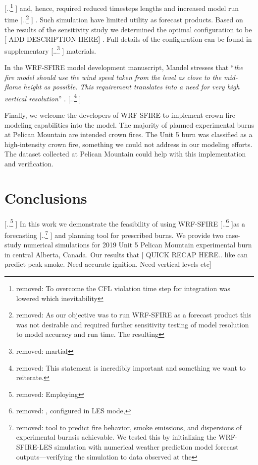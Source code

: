 \documentclass[preprints,article,accept,moreauthors,pdftex]{Definitions/mdpi}
\providecommand{\DIFadd}[1]{{\protect\color{blue} \sf #1}} %
\providecommand{\DIFdel}[1]{{\protect\color{red} [..\footnote{removed: #1} ]}} %
\providecommand{\DIFaddbegin}{} %
\providecommand{\DIFaddend}{} %
\providecommand{\DIFdelbegin}{} %
\providecommand{\DIFdelend}{} %
\begin{document}
\DIFdel{To overcome the CFL violation time step for integration was lowered which inevitability }\DIFdelend \DIFaddbegin \DIFadd{and, hence, required reduced timesteps lengths and }\DIFaddend increased model run time\DIFdelbegin \DIFdel{As our objective was to run WRF-SFIRE as a forecast product this was not desirable and required further sensitivity testing of model resolution to model accuracy and run time. The resulting }\DIFdelend \DIFaddbegin \DIFadd{. Such simulation have limited utility as forecast products. Based on the results of the sensitivity study we determined the optimal configuration to be }[\DIFadd{ADD DESCRIPTION HERE}]\DIFadd{. Full details of the }\DIFaddend configuration can be found in supplementary \DIFdelbegin \DIFdel{martial}\DIFdelend \DIFaddbegin \DIFadd{materials}\DIFaddend .



In the WRF-SFIRE model development manuscript, Mandel stresses that ``\textit{the fire model should use the wind speed taken from the level as close to the mid-flame height as possible. This requirement translates into a need for very high vertical resolution}'' \cite{mandel_coupled_2011}.
\DIFdelbegin \DIFdel{This statement is incredibly important and something we want to reiterate.
}\DIFdelend

Finally, we welcome the developers of WRF-SFIRE to implement crown fire modeling capabilities into the model. The majority of planned experimental burns at Pelican Mountain are intended crown fires. The Unit 5 burn was classified as a high-intensity crown fire, something we could not address in our modeling efforts. The dataset collected at Pelican Mountain could help with this implementation and verification.


\section{Conclusions}

\DIFdelbegin \DIFdel{Employing }\DIFdelend \DIFaddbegin \DIFadd{In this work we demonstrate the feasibility of using }\DIFaddend WRF-SFIRE \DIFdelbegin \DIFdel{, configured in LES mode, }\DIFdelend as a forecasting \DIFdelbegin \DIFdel{tool to predict fire behavior, smoke emissions, and dispersions of experimental burnsis achievable. We tested this by initializing the WRF-SFIRE-LES simulation with numerical weather prediction model forecast outputs—verifying the simulation to data observed at the }\DIFdelend \DIFaddbegin \DIFadd{and planning tool for prescribed burns. We provide two case-study numerical simulations for }\DIFaddend 2019 Unit 5 Pelican Mountain experimental burn in central Alberta, Canada. \DIFaddbegin \DIFadd{Our results  that }[\DIFadd{QUICK RECAP HERE.. like can predict peak smoke. Need accurate ignition. Need vertical levels etc}]
\DIFaddend
\end{document}
